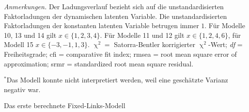 \documentclass[11pt, twoside, a4paper]{book}		%
\begin{document}
\begin{table}[htbp]
\begin{adjustbox}{width=1\textwidth, keepaspectratio}
\begin{threeparttable}
{\begin{tabular}
					
				\end{tabular}%
			}
			\begin{tablenotes}[flushleft]
				\footnotesize				%
				\setlength{}	%
				\item \textit{Anmerkungen.} Der Ladungsverlauf bezieht sich auf die unstandardisierten Faktorladungen der dynamischen latenten Variable. Die unstandardisierten Faktorladungen der konstanten latenten Variable betrugen immer $1$. Für Modelle 10, 13 und 14 gilt $x\in\{1,2,3,4\}$. Für Modelle 11 und 12 gilt $x\in\{1,2,4,6\}$, für Modell 15 $x\in\{-3,-1,1,3\}$. $\upchi^2 =$ Satorra-Bentler \citeyearpar{Satorra1994} korrigierter $\upchi^2$-Wert; \textit{df} = Freiheitsgrade; \gls{cfi} = comparative fit index; \gls{rmsea} = root mean square error of approximation; \gls{srmr} = standardized root mean square residual.
				\item {$^{*}$}Das Modell konnte nicht interpretiert werden, weil eine geschätzte Varianz negativ war.
				
			\end{tablenotes}%
		\end{threeparttable}
	\end{adjustbox}
\end{table}



 Das erste berechnete Fixed-Links-Modell 
\end{document}
